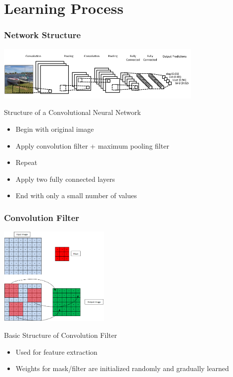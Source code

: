 \documentclass{beamer}
\begin{document}
\section{Learning Process}
\begin{frame}

    \frametitle{Network Structure}
    \begin{center}
    \includegraphics[width=0.75\textwidth]{ConvolutionalNeuralNetwork.png} \\
    \begin{tiny}
    Structure of a Convolutional Neural Network
    \end{tiny}
    \end{center}
    \begin{itemize}
    \item Begin with original image
    \item Apply convolution filter + maximum pooling filter
    \item Repeat
    \item Apply two fully connected layers
    \item End with only a small number of values
    \end{itemize}

\end{frame}


\begin{frame}

    \frametitle{Convolution Filter}
    \begin{center}
    \includegraphics[width=0.40\textwidth]{ConvolutionFilter.jpeg} \\
    \begin{tiny}
    Basic Structure of Convolution Filter
    \end{tiny}
    \end{center}
    \begin{itemize}
    \item Used for feature extraction
    \item Weights for mask/filter are initialized randomly and gradually learned
    \end{itemize}
    
\end{frame}
\end{document}
